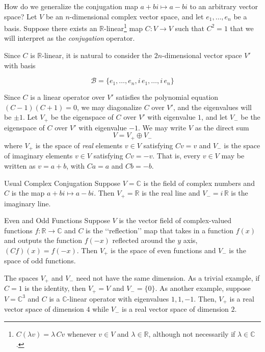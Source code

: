 \documentclass{amsart}
\newcommand{\R}{\mathbb{R}}
\newcommand{\C}{\mathbb{C}}
\newcommand{\dq}[1]{\lq\lq{#1}\rq\rq}
\begin{document}
How do we generalize the conjugation map $a+bi \mapsto a-bi$ to an arbitrary vector space? Let $V$ be an $n$-dimensional complex vector space, and let $e_1, \dots, e_n$ be a basis. Suppose there exists an $\R$-linear\footnote{$C(\lambda v) = \lambda \, C v$ whenever $v \in V$ and $\lambda \in \R$, although not necessarily if $\lambda \in \C$.} map $C: V \to V$ such that $C^2 = 1$ that we will interpret as the \emph{conjugation} operator.

Since $C$ is $\R$-linear, it is natural to consider the $2n$-dimensional vector space $V'$ with basis 

$$\mathcal{B} = \{e_1, \dots, e_n, i \, e_1, \dots, i \, e_n\}$$

Since $C$ is a linear operator over $V'$ satisfies the polynomial equation $(C - 1)(C + 1) = 0$, we may diagonalize $C$ over $V'$, and the eigenvalues will be $\pm 1$. Let $V_+$ be the eigenspace of $C$ over $V'$ with eigenvalue $1$, and let $V_-$ be the eigenspace of $C$ over $V'$ with eigenvalue $-1$. We may write $V$ as the direct sum
$$V = V_+ \oplus V_- $$
where $V_+$ is the space of \emph{real} elements $v \in V$ satisfying $Cv = v$ and $V_-$ is the space of imaginary elements $v \in V$ satisfying $Cv = -v$. That is, every $v \in V$ may be written as $v = a + b$, with $Ca = a$ and $Cb = -b$. 


\begin{example}{Usual Complex Conjugation}
Suppose $V = \C$ is the field of complex numbers and $C$ is the map $a+bi \mapsto a-bi$. Then $V_+ = \R$ is the real line and $V_- = i \, \R$ is the imaginary line.
\end{example}

\begin{example}{Even and Odd Functions}
Suppose $V$ is the vector field of complex-valued functions $f: \R \to \C$ and $C$ is the \dq{reflection} map that takes in a function $f(x)$ and outputs the function $f(-x)$ reflected around the $y$ axis, $(C f)(x) = f(-x)$. Then $V_+$ is the space of even functions and $V_-$ is the space of odd functions.
\end{example}

The spaces $V_+$ and $V_-$ need not have the same dimension. As a trivial example, if $C = 1$ is the identity, then $V_+ = V$ and $V_- = \{0\}$. As another example, suppose $V = \C^3$ and $C$ is a $\C$-linear operator with eigenvalues $1, 1, -1$. Then, $V_+$ is a real vector space of dimension $4$ while $V_-$ is a real vector space of dimension $2$.
\end{document}
